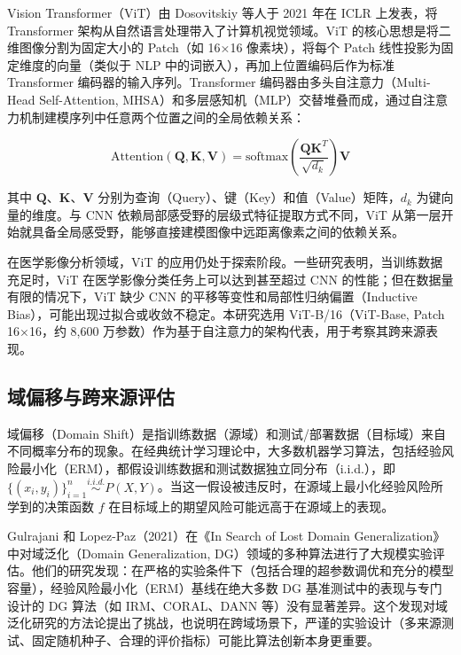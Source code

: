 \documentclass[12pt,a4paper,UTF8,openany]{ctexbook}
\begin{document}
Vision Transformer（ViT）由 Dosovitskiy 等人于 2021 年在 ICLR 上发表\cite{dosovitskiy2021}，将 Transformer 架构从自然语言处理带入了计算机视觉领域。ViT 的核心思想是将二维图像分割为固定大小的 Patch（如 16×16 像素块），将每个 Patch 线性投影为固定维度的向量（类似于 NLP 中的词嵌入），再加上位置编码后作为标准 Transformer 编码器的输入序列。Transformer 编码器由多头自注意力（Multi-Head Self-Attention, MHSA）和多层感知机（MLP）交替堆叠而成，通过自注意力机制建模序列中任意两个位置之间的全局依赖关系：

\begin{equation}
\text{Attention}(\mathbf{Q}, \mathbf{K}, \mathbf{V}) = \text{softmax}\left(\frac{\mathbf{Q}\mathbf{K}^T}{\sqrt{d_k}}\right)\mathbf{V}
\end{equation}

其中 $\mathbf{Q}$、$\mathbf{K}$、$\mathbf{V}$ 分别为查询（Query）、键（Key）和值（Value）矩阵，$d_k$ 为键向量的维度。与 CNN 依赖局部感受野的层级式特征提取方式不同，ViT 从第一层开始就具备全局感受野，能够直接建模图像中远距离像素之间的依赖关系。

在医学影像分析领域，ViT 的应用仍处于探索阶段。一些研究表明，当训练数据充足时，ViT 在医学影像分类任务上可以达到甚至超过 CNN 的性能；但在数据量有限的情况下，ViT 缺少 CNN 的平移等变性和局部性归纳偏置（Inductive Bias），可能出现过拟合或收敛不稳定。本研究选用 ViT-B/16（ViT-Base, Patch 16×16，约 8,600 万参数）作为基于自注意力的架构代表，用于考察其跨来源表现。

\subsection{域偏移与跨来源评估}

域偏移（Domain Shift）是指训练数据（源域）和测试/部署数据（目标域）来自不同概率分布的现象。在经典统计学习理论中，大多数机器学习算法，包括经验风险最小化（ERM），都假设训练数据和测试数据独立同分布（i.i.d.），即 $\{(x_i, y_i)\}_{i=1}^n \overset{i.i.d.}{\sim} P(X,Y)$。当这一假设被违反时，在源域上最小化经验风险所学到的决策函数 $f$ 在目标域上的期望风险可能远高于在源域上的表现\cite{gulrajani2021}。

Gulrajani 和 Lopez-Paz（2021）在《In Search of Lost Domain Generalization》中对域泛化（Domain Generalization, DG）领域的多种算法进行了大规模实验评估\cite{gulrajani2021}。他们的研究发现：在严格的实验条件下（包括合理的超参数调优和充分的模型容量），经验风险最小化（ERM）基线在绝大多数 DG 基准测试中的表现与专门设计的 DG 算法（如 IRM、CORAL、DANN 等）没有显著差异。这个发现对域泛化研究的方法论提出了挑战，也说明在跨域场景下，严谨的实验设计（多来源测试、固定随机种子、合理的评价指标）可能比算法创新本身更重要。
\end{document}
